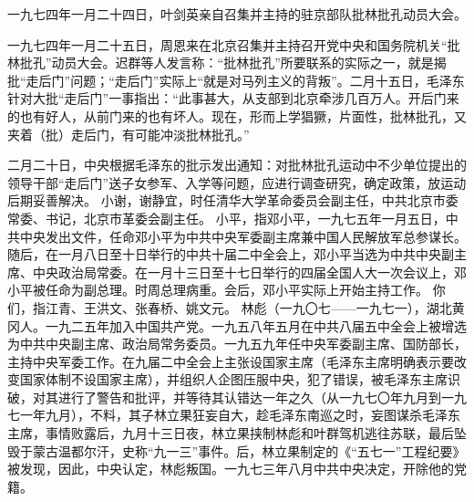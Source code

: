 \begin{maonote}
一九七四年一月二十四日，叶剑英亲自召集并主持的驻京部队批林批孔动员大会。

一九七四年一月二十五日，周恩来在北京召集并主持召开党中央和国务院机关“批林批孔”动员大会。迟群等人发言称：“批林批孔”所要联系的实际之一，就是揭批“走后门”问题；“走后门”实际上“就是对马列主义的背叛”。二月十五日，毛泽东针对大批“走后门”一事指出：“此事甚大，从支部到北京牵涉几百万人。开后门来的也有好人，从前门来的也有坏人。现在，形而上学猖獗，片面性，批林批孔，又夹着（批）走后门，有可能冲淡批林批孔。”

二月二十日，中央根据毛泽东的批示发出通知：对批林批孔运动中不少单位提出的领导干部“走后门”送子女参军、入学等问题，应进行调查研究，确定政策，放运动后期妥善解决。
小谢，谢静宜，时任清华大学革命委员会副主任，中共北京市委常委、书记，北京市革委会副主任。
小平，指邓小平，一九七五年一月五日，中共中央发出文件，任命邓小平为中共中央军委副主席兼中国人民解放军总参谋长。随后，在一月八日至十日举行的中共十届二中全会上，邓小平当选为中共中央副主席、中央政治局常委。在一月十三日至十七日举行的四届全国人大一次会议上，邓小平被任命为副总理。时周总理病重。会后，邓小平实际上开始主持工作。
你们，指江青、王洪文、张春桥、姚文元。
林彪（一九〇七——一九七一），湖北黄冈人。一九二五年加入中国共产党。一九五八年五月在中共八届五中全会上被增选为中共中央副主席、政治局常务委员。一九五九年任中央军委副主席、国防部长，主持中央军委工作。在九届二中全会上主张设国家主席（毛泽东主席明确表示要改变国家体制不设国家主席），并组织人企图压服中央，犯了错误，被毛泽东主席识破，对其进行了警告和批评，并等待其认错达一年之久（从一九七〇年九月到一九七一年九月），不料，其子林立果狂妄自大，趁毛泽东南巡之时，妄图谋杀毛泽东主席，事情败露后，九月十三日夜，林立果挟制林彪和叶群驾机逃往苏联，最后坠毁于蒙古温都尔汗，史称“九一三”事件。后，林立果制定的《“五七一”工程纪要》被发现，因此，中央认定，林彪叛国。一九七三年八月中共中央决定，开除他的党籍。


\end{maonote}
